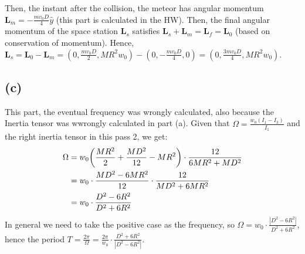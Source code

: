 \documentclass{article}
\DeclarePairedDelimiter{\paran}{(}{)}%
\newcommand{\bL}{\textbf{L}} %
\begin{document}
Then, the instant after the collision, the meteor has angular momentum $\bL_m = -\frac{mv_0D}{4}\hat{y}$ (this part is calculated in the HW). Then, the final angular momentum of the space station $\bL_s$ satisfies $\bL_s + \bL_m = \bL_f = \bL_0$ (based on conservation of momentum). Hence, $\bL_s = \bL_0-\bL_m = (0,\frac{mv_0D}{2}, MR^2w_0)-(0,-\frac{mv_0D}{4},0) = (0,\frac{3mv_0D}{4},MR^2w_0)$.

\subsection*{(c)}
This part, the eventual frequency was wrongly calculated, also because the Inertia tensor was wwrongly calculated in part (a). Given that $\Omega = \frac{w_0(I_1-I_3)}{I_1}$ and the right inertia tensor in this pass 2, we get:
\begin{align}
    \Omega &= w_0\paran*{\frac{MR^2}{2}+\frac{MD^2}{12}-MR^2}\cdot \frac{12}{6MR^2+MD^2}\\
    &= w_0\cdot \frac{MD^2-6MR^2}{12}\cdot \frac{12}{MD^2+6MR^2}\\
    &= w_0\cdot\frac{D^2-6R^2}{D^2+6R^2}
\end{align}
In general we need to take the positive case as the frequency, so $\Omega = w_0\cdot\frac{|D^2-6R^2|}{D^2+6R^2}$, hence the period $T=\frac{2\pi}{\Omega} = \frac{2\pi}{w_0}\cdot\frac{D^2+6R^2}{|D^2-6R^2|}$.
\end{document}
